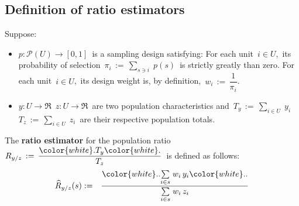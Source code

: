 
\subsection{Definition of ratio estimators}


\begin{definition}
\mbox{}
\vskip 0.05cm
\noindent
Suppose:
\begin{itemize}
\item
    $p : \mathcal{P}(U) \longrightarrow [0,1]$\,
    is a sampling design satisfying:
    For each unit \,$i \in U$,\,
    its probability of selection
    \,$\pi_{i} \,:=\, \underset{s \ni i}{\sum}\;p(s)$\,
    is strictly greatly than zero.
    For each unit \,$i \in U$,\,
    its design weight is, by definition,
    \,$w_{i} \,:=\, \dfrac{1}{\pi_{i}}$.\,
\item
    $y : U \longrightarrow \Re$\,
    $z : U \longrightarrow \Re$\,
    are two population characteristics and
    \,$T_{y} \,:=\, \underset{i \in U}{\sum}\;y_{i}$\,
    \,$T_{z} \,:=\, \underset{i \in U}{\sum}\;z_{i}$\,
    are their respective population totals.
\end{itemize}
The \textbf{ratio estimator} for the population ratio
\,$R_{y/z} \,:=\, \dfrac{{\color{white}.}T_{y}{\color{white}.}}{T_{z}}$\,
is defined as follows:
\begin{eqnarray*}
\widehat{R}_{y/z}(s)
& := &
    \dfrac{{\color{white}..}
        \underset{i \in s}{\sum}\;w_{i}\,y_{i}
        {\color{white}..}}{
        \underset{i \in s}{\sum}\;w_{i}\,z_{i}
        }
\end{eqnarray*}
\end{definition}

